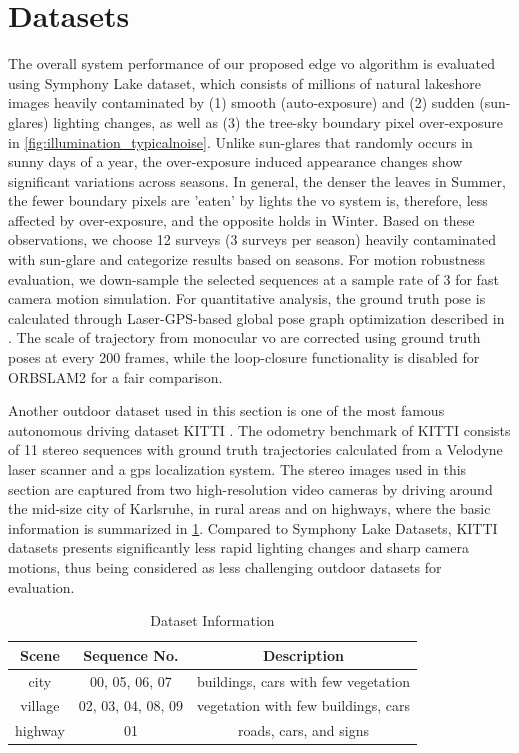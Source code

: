 \section{Datasets}

The overall system performance of our proposed edge \acrshort{vo} algorithm is evaluated using Symphony Lake \cite{griffith2017symphony} dataset, which consists of millions of natural lakeshore images heavily contaminated by (1) smooth (auto-exposure) and (2) sudden (sun-glares) lighting changes, as well as (3) the tree-sky boundary pixel over-exposure in \ref{fig:illumination_typicalnoise}. Unlike sun-glares that randomly occurs in sunny days of a year, the over-exposure induced appearance changes show significant variations across seasons. In general, the denser the leaves in Summer, the fewer boundary pixels are 'eaten' by lights the \acrshort{vo} system is, therefore, less affected by over-exposure, and the opposite holds in Winter. Based on these observations, we choose 12 surveys (3 surveys per season) heavily contaminated with sun-glare and categorize results based on seasons. For motion robustness evaluation, we down-sample the selected sequences at a sample rate of 3 for fast camera motion simulation. For quantitative analysis, the ground truth pose is calculated through Laser-GPS-based global pose graph optimization described in \cite{pradalier2018multi}. The scale of trajectory from monocular \acrshort{vo} are corrected using ground truth poses at every 200 frames, while the loop-closure functionality is disabled for ORBSLAM2 \cite{mur2017orb} for a fair comparison.

Another outdoor dataset used in this section is one of the most famous autonomous driving dataset KITTI \cite{geiger2012we}.  
The odometry benchmark of KITTI consists of 11 stereo sequences with ground truth trajectories calculated from a Velodyne laser scanner and a \acrshort{gps} localization system.
The stereo images used in this section are captured from two high-resolution video cameras by driving around the mid-size city of Karlsruhe, in rural areas and on highways, where the basic information is summarized in \ref{tbl:kitti_dataset}. 
Compared to Symphony Lake Datasets, KITTI datasets presents significantly less rapid lighting changes and sharp camera motions, thus being considered as less challenging outdoor datasets for evaluation. 

\begin{table}[h]
	\centering
	\caption[Dataset Information]{ Dataset Information
	\label{tbl:kitti_dataset}}
	\begin{tabular}{ccc}
\hline
Scene   & Sequence No.        & Description                              \\ \hline
city    & 00, 05, 06, 07      & buildings, cars with few vegetation  \\
village & 02, 03, 04,  08, 09 & vegetation with few buildings, cars \\
highway & 01                  & roads, cars, and signs                   \\ \hline
	\end{tabular}
\end{table}

